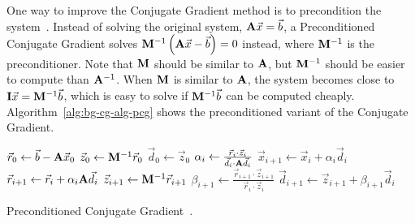 One way to improve the Conjugate Gradient method is to precondition the system~\cite{Saad:2003:IterativeMethods}.
Instead of solving the original system, \(\mathbf{A}\vec{x} = \vec{b}\), a Preconditioned Conjugate Gradient solves \(\mathbf{M}^{-1}\left(\mathbf{A}\vec{x} - \vec{b}\right) = 0\) instead, where \(\mathbf{M}^{-1}\) is the preconditioner.
Note that \(\mathbf{M}\) should be similar to \(\mathbf{A}\), but \(\mathbf{M}^{-1}\) should be easier to compute than \(\mathbf{A}^{-1}\).
When \(\mathbf{M}\) is similar to \(\mathbf{A}\), the system becomes close to \(\mathbf{I}\vec{x} = \mathbf{M}^{-1}\vec{b}\), which is easy to solve if \(\mathbf{M}^{-1}\vec{b}\) can be computed cheaply.
Algorithm~\ref{alg:bg-cg-alg-pcg} shows the preconditioned variant of the Conjugate Gradient.
\begin{algorithm}[tb]
	\begin{algorithmic}
		\STATE \(\vec{r}_0 \gets \vec{b} - \mathbf{A}\vec{x}_0\)
		\STATE \(\vec{z}_0 \gets \mathbf{M}^{-1}\vec{r}_0\)
		\STATE \(\vec{d}_0 \gets \vec{z}_0\)
			\STATE \(\alpha_i \gets \frac{\vec{r}_i\cdot\vec{z}_i}{\vec{d}_i\cdot\mathbf{A}\vec{d}_i}\)
			\STATE \(\vec{x}_{i+1} \gets \vec{x}_i + \alpha_i\vec{d}_i\)
			\STATE \(\vec{r}_{i+1} \gets \vec{r}_i + \alpha_i\mathbf{A}\vec{d}_i\)
			\STATE \(\vec{z}_{i+1} \gets \mathbf{M}^{-1}\vec{r}_{i+1}\)
			\STATE \(\beta_{i+1} \gets \frac{\vec{r}_{i+1}\cdot\vec{z}_{i+1}}{\vec{r}_i\cdot\vec{z}_i}\)
			\STATE \(\vec{d}_{i+1} \gets \vec{z}_{i+1} + \beta_{i+1}\vec{d}_i\)
		\ENDFOR
	\end{algorithmic}
	
	\caption{Preconditioned Conjugate Gradient~\cite{Saad:2003:IterativeMethods}.}
	\label{alg:bg-cg-alg-pcg}
\end{algorithm}